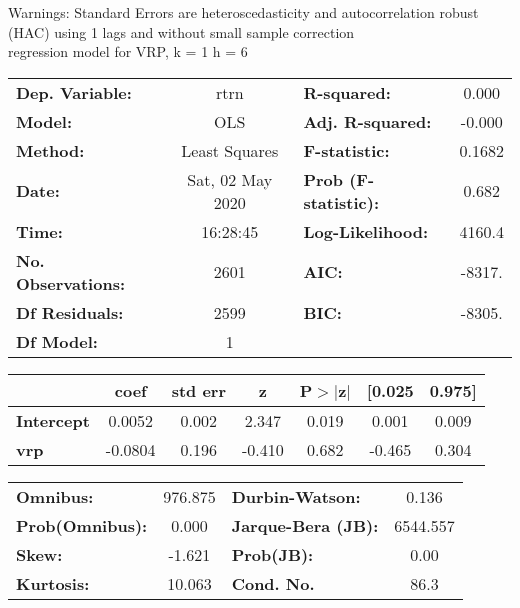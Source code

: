 Warnings: \newline
 [1] Standard Errors are heteroscedasticity and autocorrelation robust (HAC) using 1 lags and without small sample correction\\ 

regression model for VRP, k = 1 h = 6\begin{center}
\begin{tabular}{lclc}
\toprule
\textbf{Dep. Variable:}    &       rtrn       & \textbf{  R-squared:         } &     0.000   \\
\textbf{Model:}            &       OLS        & \textbf{  Adj. R-squared:    } &    -0.000   \\
\textbf{Method:}           &  Least Squares   & \textbf{  F-statistic:       } &    0.1682   \\
\textbf{Date:}             & Sat, 02 May 2020 & \textbf{  Prob (F-statistic):} &    0.682    \\
\textbf{Time:}             &     16:28:45     & \textbf{  Log-Likelihood:    } &    4160.4   \\
\textbf{No. Observations:} &        2601      & \textbf{  AIC:               } &    -8317.   \\
\textbf{Df Residuals:}     &        2599      & \textbf{  BIC:               } &    -8305.   \\
\textbf{Df Model:}         &           1      & \textbf{                     } &             \\
\bottomrule
\end{tabular}
\begin{tabular}{lcccccc}
                   & \textbf{coef} & \textbf{std err} & \textbf{z} & \textbf{P$> |$z$|$} & \textbf{[0.025} & \textbf{0.975]}  \\
\midrule
\textbf{Intercept} &       0.0052  &        0.002     &     2.347  &         0.019        &        0.001    &        0.009     \\
\textbf{vrp}       &      -0.0804  &        0.196     &    -0.410  &         0.682        &       -0.465    &        0.304     \\
\bottomrule
\end{tabular}
\begin{tabular}{lclc}
\textbf{Omnibus:}       & 976.875 & \textbf{  Durbin-Watson:     } &    0.136  \\
\textbf{Prob(Omnibus):} &   0.000 & \textbf{  Jarque-Bera (JB):  } & 6544.557  \\
\textbf{Skew:}          &  -1.621 & \textbf{  Prob(JB):          } &     0.00  \\
\textbf{Kurtosis:}      &  10.063 & \textbf{  Cond. No.          } &     86.3  \\
\bottomrule
\end{tabular}
\end{center}

